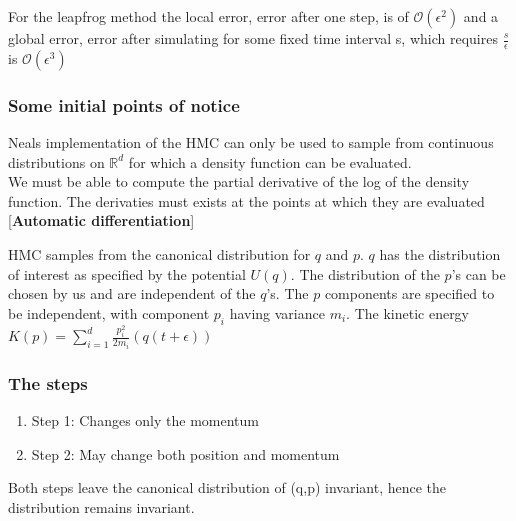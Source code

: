 \documentclass[]{report}
\begin{document}
For the leapfrog method the local error, error after one step, is of $\mathcal{O}(\epsilon^{2})$ and a global error, error after simulating for some fixed time interval s, which requires $\frac{s}{\epsilon}$ is $\mathcal{O}(\epsilon^{3})$
\subsubsection{Some initial points of notice}
Neals implementation of the HMC can only be used to sample from continuous distributions on $\mathbb{R}^{d}$ for which a density function can be evaluated.\\
We must be able to compute the partial derivative of the log of the density function. The derivaties must exists at the points at which they are evaluated [\textbf{Automatic differentiation}]

HMC samples from the canonical distribution for $q$ and $p$. $q$ has the distribution of interest as specified by the potential $U(q)$. 
The distribution of the $p$'s can be chosen by us and are independent of the $q$'s. 
The $p$ components are specified to be independent, with component $p_{i}$ having variance $m_{i}$.
The kinetic energy $K(p) = \sum_{i =1}^{d}\frac{p_{i}^{2}}{2m_{i}}(q(t + \epsilon))
$

\subsubsection{The steps}

\begin{enumerate}
	\item Step 1: Changes only the momentum
	\item Step 2: May change both position and momentum
\end{enumerate}
Both steps leave the canonical distribution of (q,p) invariant, hence the distribution remains invariant.
\end{document}
